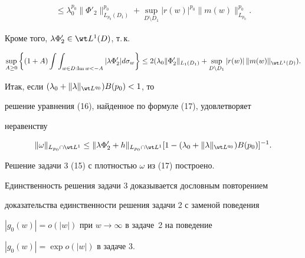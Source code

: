 \begin{pf}
\begin{multline*}
%


\leq \lambda_0^{p_0} \|\Phi'_2\|_{L_{p_0} (D_1)}^{p_0}


+ \sup_{D \setminus D_1} |r(w)|^{p_0} \|m(w)\|_{L_{p_0}}^{p_0}.


\end{multline*}


Кроме того, $\lambda \Phi'_2 \in \wt L^1(D)$, т.\,к.


$$


\sup_{A \geq 0} \bigg\{ (1 + A) \int\int_{w \in D: \im w < -A} |\lambda


\Phi'_2| d\sigma_w \bigg\} \leq 2(\lambda_0 \|\Phi'_2\|_{L_1(D_1)} +


\sup_{D \setminus D_1} |r(w)|\, \|m(w)\|_{\wt L^1(D)}).


$$


Итак, если $(\lambda_0 + \|\lambda\|_{\wt L^{q_0}}) B(p_0) < 1$, то


решение уравнения (16), найденное по формуле (17), удовлетворяет


неравенству


$$


\|\omega\|_{L_{p_0} \cap \wt L^1} \leq \|\lambda \Phi'_2 + h\|_{L_{p_0}


\cap \wt L^1} [1 - (\lambda_0 + \|\lambda\|_{\wt L^{q_0}}) B(p_0)]^{-1}.


$$





Решение задачи 3 (15) с плотностью $\omega$ из (17) построено.





Единственность решения задачи 3 доказывается дословным повторением 


доказательства единственности решения задачи 2 с заменой поведения


$|g_0(w)|=o(|w|)$ при $w\to\infty$ в задаче~2 на поведение


$|g_0(w)|=\exp o(|w|)$ в задаче 3.


\end{pf}





